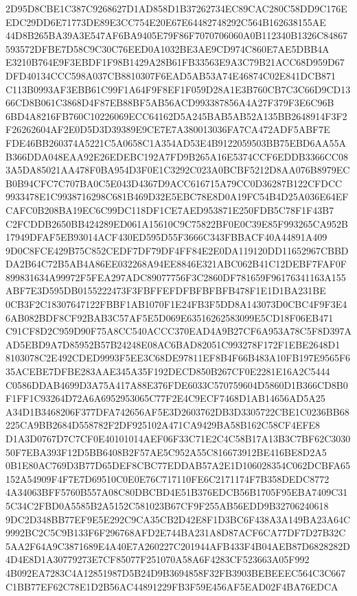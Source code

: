 \documentclass[UTF8,fontset=fandol,zihao=-4,a4paper]{ctexart}
\begin{document}
{{2D95D8CBE1C387C9268627D1AD858D1B37262734EC89CAC280C58DD9C176EEDC29DD6E71773DE89E3CC754E20E67E64482748292C564B162638155AE
44D8B265BA39A3E547AF6BA9405E79F86F7070706060A0B112340B1326C84867593572DFBE7D58C9C30C76EED0A1032BE3AE9CD974C860E7AE5DBB4A
E3210B764E9F3EBDF1F98B1429A28B61FB33563E9A3C79B21ACC68D959D67DFD40134CCC598A037CB8810307F6EAD5AB53A74E46874C02E841DCB871
C113B0993AF3EBB61C99F1A64F9F8EF1F059D28A1E3B760CB7C3C66D9CD1366CD8B061C3868D4F87EB88BF5AB56ACD993387856A4A27F379F3E6C96B
6BD4A8216FB760C10226069ECC64162D5A245BAB5AB52A135BB2648914F3F2F26262604AF2E0D5D3D39389E9CE7E7A380013036FA7CA472ADF5ABF7E
FDE46BB260374A5221C5A0658C1A354AD53E4B9122059503BB75EBD6AA55AB366DDA048EAA92E26EDEBC192A7FD9B265A16E5374CCF6EDDB3366CC08
3A5DA85021AA478F0BA954D3F0E1C3292C023A0BCBF5212D8AA076B8979ECB0B94CFC7C707BA0C5E043D4367D9ACC616715A79CC0D36287B122CFDCC
9933478E1C9938716298C681B469D32E5EBC78E8D0A19FC54B4D25A036E64EFCAFC0B208BA19EC6C99DC118DF1CE7AED953871E250FDB5C78F1F43B7
C2FCDDB2650BB424289ED061A15610C9C75822BF0E0C39E85F993265CA952B17949DFAF5EB93014ACF430ED595D55F3666C343FBBACF40A44891A409
9D0C8FCE429B75C852CEDF7DF79DF4FF84E2E0DA119120DD11652967CBBDDA2B64C72B5AB4A86EE032268A94EE8846E321ABC062B41C12DEBF7FAF0F
899831634A99972F5FEA297ADC89077756F3C2860DF781659F96176341163A155ABF7E3D595DB0155222473F3FBFFEFDFBFBFBFB478F1E1D1BA231BE
0CB3F2C18307647122FBBF1AB1070F1E24FB3F5DD8A143073D0CBC4F9F3E46AB082BDF8CF92BAB3C57AF5E5D069E63516262583099E5CD18F06EB471
C91CF8D2C959D90F75A8CC540ACCC370EAD4A9B27CF6A953A78C5F8D397AAD5EBD9A7D85952B57B24248E08AC6BAD82051C993278F172F1EBE2648D1
8103078C2E492CDED9993F5EE3C68DE97811EF8B4F66B483A10FB197E9565F635ACEBE7DFBE283AAE345A35F192DECD850B267CF0E2281E16A2C5444
C0586DDAB4699D3A75A417A88E376FDE6033C570759604D5860D1B366CD8B0F1FF1C93264D72A6A6952953065C77F2E4C9ECF7468D1AB14656AD5A25
A34D1B3468206F377DFA742656AF5E3D2603762DB3D3305722CBE1C0236BB68225CA9BB2684D558782F2DF925102A471CA9429BA58B162C58CF4EFE8
D1A3D0767D7C7CF0E40101014AEF06F33C71E2C4C58B17A13B3C7BF62C303050F7EBA393F12D5BB6408B2F57AE5C952A55C816673912BE416BE8D2A5
0B1E80AC769D3B77D65DEF8CBC77EDDAB57A2E1D106028354C062DCBFA65152A54909F4F7E7D69510C0E0E76C717110FE6C2171174F7B358DEDC8772
4A34063BFF5760B557A08C80DBCBD4E51B376EDCB56B1705F95EBA7409C315C34C2FBD0A5585B2A5152C581023B67CF9F255AB56EDD9B32706240618
9DC2D348BB77EF9E5E292C9CA35CB2D42E8F1D3BC6F438A3A149BA23A64C9992BC2C5C9B133F6F296768AFD2E744BA231A8D87ACF6CA77DF7D27B32C
5AA2F64A9C3871689E4A40E7A260227C201944AFB433F4B04AEB87D6828282D4D4E8D1A30779273E7CF85077F251070A58A6F4283CF523663A05F992
4B092EA7283C4A12851987D5B24D9B3694858F32FB3903BEBEEEC564C3C667C1BB77EF62C78E1D2B56AC44891229FB3F59E456AF5EAD02F4BA76EDCA
}}
\end{document}
